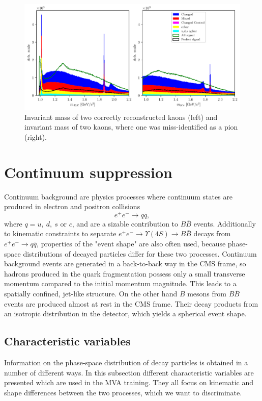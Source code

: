 \documentclass[oneside,a4paper,openany,12pt]{scrbook}
\begin{document}
\begin{figure}[H]
\centering
\captionsetup{width=0.8\linewidth}
\includegraphics[width=\linewidth]{fig/res_bkg}
\caption{Invariant mass of two correctly reconstructed kaons (left) and invariant mass of two kaons, where one was miss-identified as a pion (right).}
\label{fig:res_bkg}
\end{figure}


\section{Continuum suppression}

Continuum background are physics processes where continuum states are produced in electron and positron collisions $$e^+ e^- \to q \bar q,$$ 
where $q = u,~d,~s$ or $c$, and are a sizable contribution to $B \bar B$ events. Additionally to kinematic constraints to separate $e^+ e^- \to \Upsilon(4S) \to B \bar B$ decays from $e^+ e^- \to q \bar q$, properties of the "event shape" are also often used, because phase-space distributions of decayed particles differ for these two processes. Continuum background events are generated in a back-to-back way in the CMS frame, so hadrons produced in the quark fragmentation possess only a small transverse momentum compared to the initial momentum magnitude. This leads to a spatially confined, jet-like structure. On the other hand $B$ mesons from $B \bar B$ events are produced almost at rest in the CMS frame. Their decay products from an isotropic distribution in the detector, which yields a spherical event shape.

\subsection{Characteristic variables}
\label{ss:charvar}
Information on the phase-space distribution of decay particles is obtained in a number of different ways. In this subsection different characteristic variables are presented which are used in the MVA training. They all focus on kinematic and shape differences between the two processes, which we want to discriminate. 
\end{document}
